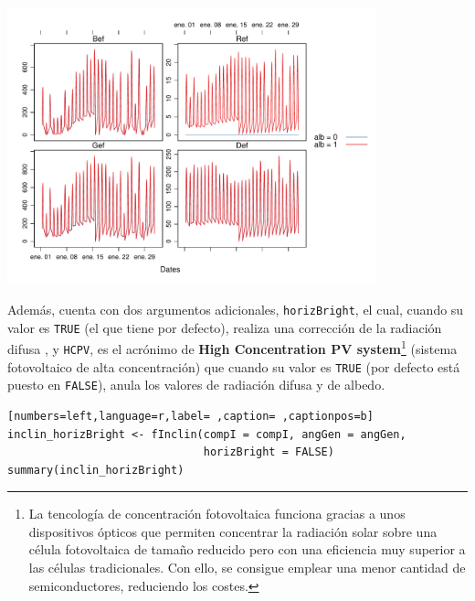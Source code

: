 \begin{itemize}
\begin{center}
\includegraphics[width=0.8\textwidth]{figuras/codigo-finclinalb.pdf}
\end{center}
Además, cuenta con dos argumentos adicionales, \texttt{horizBright}, el cual, cuando su valor es \texttt{TRUE} (el que tiene por defecto), realiza una corrección de la radiación difusa \cite{REINDL19909}, y \texttt{HCPV}, es el acrónimo de \textbf{High Concentration PV system}\footnote{La tencología de concentración fotovoltaica funciona gracias a unos dispositivos ópticos que permiten concentrar la radiación solar sobre una célula fotovoltaica de tamaño reducido pero con una eficiencia muy superior a las células tradicionales. Con ello, se consigue emplear una menor cantidad de semiconductores, reduciendo los costes.} (sistema fotovoltaico de alta concentración) que cuando su valor es \texttt{TRUE} (por defecto está puesto en \texttt{FALSE}), anula los valores de radiación difusa y de albedo.
\begin{lstlisting}[numbers=left,language=r,label= ,caption= ,captionpos=b]
inclin_horizBright <- fInclin(compI = compI, angGen = angGen,
                              horizBright = FALSE)
summary(inclin_horizBright)
\end{lstlisting}


\end{itemize}

